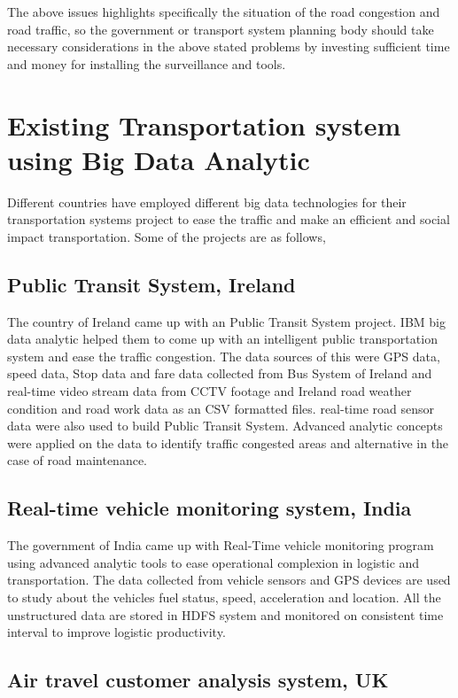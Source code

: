 \documentclass[sigconf]{acmart}
\begin{document}
The above issues highlights specifically the situation of the road congestion and road traffic, so the government or transport system planning body should take necessary considerations in the above stated problems by investing sufficient time and money for installing the surveillance and tools. 


\section{Existing Transportation system using Big Data Analytic}

Different countries have employed different big data technologies for their transportation systems project to ease the traffic and make an efficient and social impact transportation. Some of the projects are as follows,


\subsection{Public Transit System, Ireland}

The country of Ireland came up with an Public Transit System project\cite{bdlt}. IBM big data analytic helped them to come up with an intelligent public transportation system and ease the traffic congestion. The data sources of this were GPS data, speed data, Stop data and fare data collected from Bus System of Ireland and real-time video stream data from CCTV footage and  Ireland road weather condition and road work data as an CSV formatted files. real-time road sensor data were also used to build Public Transit System. Advanced analytic concepts were applied on the data to identify traffic congested areas and alternative in the case of road maintenance. 

\subsection{Real-time vehicle monitoring system, India}

The government of India came up with Real-Time vehicle monitoring program\cite{bdlt} using advanced analytic tools to ease operational complexion in logistic and transportation. The data collected from vehicle sensors and GPS devices are used to study about the vehicles fuel status, speed, acceleration and location. All the unstructured data are stored in HDFS system and monitored on consistent time interval to improve logistic productivity.

\subsection{Air travel customer analysis system, UK}
\end{document}
